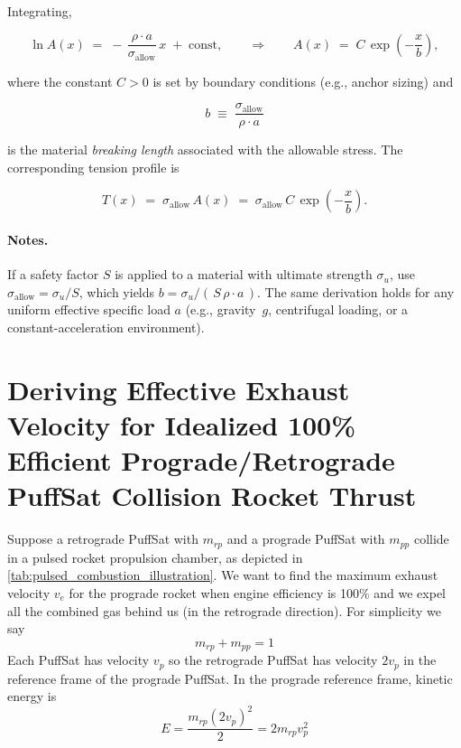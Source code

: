 \documentclass{article}
\begin{document}
Integrating,


\[
\ln A(x) \;=\; -\,\frac{\rho \cdot a}{\sigma_{\text{allow}}}\,x \;+\; \text{const},
\qquad\Rightarrow\qquad
A(x) \;=\; C \, \exp\!\left(-\frac{x}{b}\right),
\]


where the constant \(C>0\) is set by boundary conditions (e.g., anchor sizing) and


\[
b \;\equiv\; \frac{\sigma_{\text{allow}}}{\rho \cdot a}
\]


is the material \emph{breaking length} associated with the allowable stress. The corresponding tension profile is


\[
T(x) \;=\; \sigma_{\text{allow}}\,A(x) \;=\; \sigma_{\text{allow}}\,C \,\exp\!\left(-\frac{x}{b}\right).
\]



\paragraph{Notes.}
If a safety factor \(S\) is applied to a material with ultimate strength \(\sigma_u\), use \(\sigma_{\text{allow}}=\sigma_u/S\), which yields \(b=\sigma_u/(\,S\,\rho \cdot a\,)\). The same derivation holds for any uniform effective specific load \(a\) (e.g., gravity \(\,g\), centrifugal loading, or a constant-acceleration environment).

\section{Deriving Effective Exhaust Velocity for Idealized 100\% Efficient Prograde/Retrograde PuffSat Collision Rocket Thrust}\label{sec:dv_effective}
Suppose a retrograde PuffSat with $m_{rp}$ and a prograde PuffSat with $m_{pp}$ collide in a pulsed rocket propulsion chamber, as depicted in \autoref{tab:pulsed_combustion_illustration}.  We want to find the maximum exhaust velocity $v_e$ for the prograde rocket  when engine efficiency is 100\% and we expel all the combined gas behind us (in the retrograde direction).   For simplicity we say 
\begin{equation}
m_{rp} + m_{pp} = 1\label{eq:mass_is_1}
\end{equation} 
Each PuffSat has velocity $v_p$ so the retrograde PuffSat has velocity $2v_p$ in the reference frame of the prograde PuffSat.   In the prograde reference frame, kinetic energy is
\begin{equation}
E = \frac{m_{rp} (2v_p)^2}{2} = 2m_{rp}v_p^2\label{eq:ke_PuffSats}
\end{equation}
\end{document}
